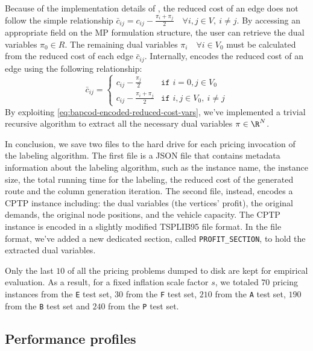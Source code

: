 Because of the implementation details of \bapcod{},
the reduced cost of an edge does not follow the simple relationship
$\bar{c}_{ij} = c_{ij} - \frac{\pi_i + \pi_j}{2} \quad \forall i, j \in V,\ i \ne j$.
By accessing an appropriate field on the MP formulation structure,
the user can retrieve the dual variables $\pi_0 \in R$.
The remaining dual variables $\pi_i \quad \forall i \in V_0$
must be calculated from the reduced cost of each edge $\bar{c}_{ij}$.
Internally, \bapcod{} encodes the reduced cost of an edge using the following relationship:
\begin{equation}
	\bar{c}_{ij} = \begin{cases}
		c_{ij} - \frac{\pi_{j}}{2}       & \texttt{if } i = 0, j \in V_0       \\
		c_{ij} - \frac{\pi_i + \pi_j}{2} & \texttt{if } i, j \in V_0,\ i \ne j
	\end{cases}
	\label{eq:bapcod-encoded-reduced-cost-vars}
\end{equation}
By exploiting \cref{eq:bapcod-encoded-reduced-cost-vars},
we've implemented a trivial recursive algorithm
to extract all the necessary dual variables $\pi \in \R^N$.

In conclusion, we save two files to the hard drive for each pricing invocation of the labeling algorithm.
The first file is a JSON file that contains metadata information about
the labeling algorithm, such as the instance name, the instance size,
the total running time for the labeling, the reduced cost of the generated route
and the column generation iteration.
The second file, instead, encodes a CPTP instance including:
the dual variables (the vertices' profit),
the original demands, the original node positions, and the vehicle capacity.
The CPTP instance is encoded in a slightly modified TSPLIB95 file format.
In the file format, we've added a new dedicated section, called \texttt{PROFIT\_SECTION},
to hold the extracted dual variables.

Only the last $10$ of all the pricing problems dumped to disk are kept for empirical evaluation.
As a result, for a fixed inflation scale factor $s$,
we totaled $70$ pricing instances from the \texttt{E} test set,
$30$ from the \texttt{F} test set,
$210$ from the \texttt{A} test set,
$190$ from the \texttt{B} test set
and $240$ from the \texttt{P} test set.

\subsection{Performance profiles}
\label{sec:results-performance-profiles}


